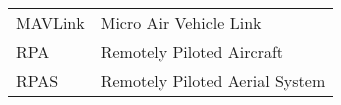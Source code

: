 \begin{longtable}{ll}
MAVLink & Micro Air Vehicle Link \\
RPA & Remotely Piloted Aircraft \\
RPAS & Remotely Piloted Aerial System \\

\end{longtable}

